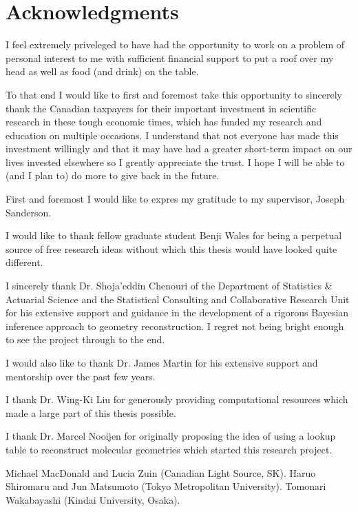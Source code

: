 
\begingroup
\let\clearpage\relax
\let\cleardoublepage\relax
\let\cleardoublepage\relax
\chapter*{Acknowledgments}
I feel extremely priveleged to have had the opportunity to work on a problem of personal interest to me with sufficient financial support to put a roof over my head as well as food (and drink) on the table.

To that end I would like to first and foremost take this opportunity to sincerely thank the Canadian taxpayers for their important investment in scientific research in these tough economic times, which has funded my research and education on multiple occasions. I understand that not everyone has made this investment willingly and that it may have had a greater short-term impact on our lives invested elsewhere so I greatly appreciate the trust. I hope I will be able to (and I plan to) do more to give back in the future.

First and foremost I would like to expres my gratitude to my supervisor, Joseph Sanderson.

I would like to thank fellow graduate student Benji Wales for being a perpetual source of free research ideas without which this thesis would have looked quite different.

I sincerely thank Dr. Shoja'eddin Chenouri of the Department of Statistics \& Actuarial Science and the Statistical Consulting and Collaborative Research Unit for his extensive support and guidance in the development of a rigorous Bayesian inference approach to geometry reconstruction. I regret not being bright enough to see the project through to the end.

I would also like to thank Dr. James Martin for his extensive support and mentorship over the past few years.

I thank Dr. Wing-Ki Liu for generously providing computational resources which made a large part of this thesis possible.

I thank Dr. Marcel Nooijen for originally proposing the idea of using a lookup table to reconstruct molecular geometries which started this research project.

Michael MacDonald and Lucia Zuin (Canadian Light Source, SK). Haruo Shiromaru and Jun Matsumoto (Tokyo Metropolitan University). Tomonari Wakabayashi (Kindai University, Osaka).

